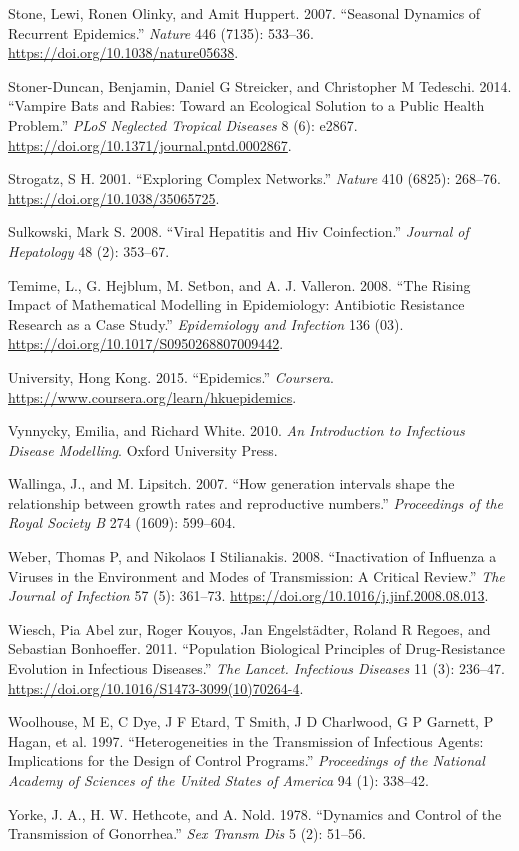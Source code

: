 \documentclass[
]{book}
\begin{document}
\leavevmode\hypertarget{ref-stone07}{}%
Stone, Lewi, Ronen Olinky, and Amit Huppert. 2007. ``Seasonal Dynamics of Recurrent Epidemics.'' \emph{Nature} 446 (7135): 533--36. \url{https://doi.org/10.1038/nature05638}.

\leavevmode\hypertarget{ref-stoner-duncan14}{}%
Stoner-Duncan, Benjamin, Daniel G Streicker, and Christopher M Tedeschi. 2014. ``Vampire Bats and Rabies: Toward an Ecological Solution to a Public Health Problem.'' \emph{PLoS Neglected Tropical Diseases} 8 (6): e2867. \url{https://doi.org/10.1371/journal.pntd.0002867}.

\leavevmode\hypertarget{ref-strogatz01}{}%
Strogatz, S H. 2001. ``Exploring Complex Networks.'' \emph{Nature} 410 (6825): 268--76. \url{https://doi.org/10.1038/35065725}.

\leavevmode\hypertarget{ref-sulkowski08}{}%
Sulkowski, Mark S. 2008. ``Viral Hepatitis and Hiv Coinfection.'' \emph{Journal of Hepatology} 48 (2): 353--67.

\leavevmode\hypertarget{ref-temime08}{}%
Temime, L., G. Hejblum, M. Setbon, and A. J. Valleron. 2008. ``The Rising Impact of Mathematical Modelling in Epidemiology: Antibiotic Resistance Research as a Case Study.'' \emph{Epidemiology and Infection} 136 (03). \url{https://doi.org/10.1017/S0950268807009442}.

\leavevmode\hypertarget{ref-hkepidemics}{}%
University, Hong Kong. 2015. ``Epidemics.'' \emph{Coursera}. \url{https://www.coursera.org/learn/hkuepidemics}.

\leavevmode\hypertarget{ref-vynnycky10}{}%
Vynnycky, Emilia, and Richard White. 2010. \emph{An Introduction to Infectious Disease Modelling}. Oxford University Press.

\leavevmode\hypertarget{ref-wallinga07}{}%
Wallinga, J., and M. Lipsitch. 2007. ``How generation intervals shape the relationship between growth rates and reproductive numbers.'' \emph{Proceedings of the Royal Society B} 274 (1609): 599--604.

\leavevmode\hypertarget{ref-weber08}{}%
Weber, Thomas P, and Nikolaos I Stilianakis. 2008. ``Inactivation of Influenza a Viruses in the Environment and Modes of Transmission: A Critical Review.'' \emph{The Journal of Infection} 57 (5): 361--73. \url{https://doi.org/10.1016/j.jinf.2008.08.013}.

\leavevmode\hypertarget{ref-wiesch11}{}%
Wiesch, Pia Abel zur, Roger Kouyos, Jan Engelstädter, Roland R Regoes, and Sebastian Bonhoeffer. 2011. ``Population Biological Principles of Drug-Resistance Evolution in Infectious Diseases.'' \emph{The Lancet. Infectious Diseases} 11 (3): 236--47. \url{https://doi.org/10.1016/S1473-3099(10)70264-4}.

\leavevmode\hypertarget{ref-woolhouse97}{}%
Woolhouse, M E, C Dye, J F Etard, T Smith, J D Charlwood, G P Garnett, P Hagan, et al. 1997. ``Heterogeneities in the Transmission of Infectious Agents: Implications for the Design of Control Programs.'' \emph{Proceedings of the National Academy of Sciences of the United States of America} 94 (1): 338--42.

\leavevmode\hypertarget{ref-yorke78}{}%
Yorke, J. A., H. W. Hethcote, and A. Nold. 1978. ``Dynamics and Control of the Transmission of Gonorrhea.'' \emph{Sex Transm Dis} 5 (2): 51--56.
\end{document}

